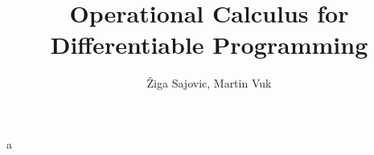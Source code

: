 
\title{Operational Calculus for Differentiable Programming}

\author{\v{Z}iga Sajovic, Martin Vuk}



\maketitle








a

\printbibliography

  
